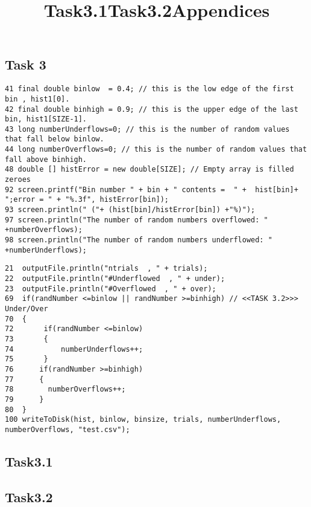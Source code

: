\documentclass{article}
\begin{document}
\begin{multicols}{2}
	\section{Task 3}
		\begin{table*}[h]
			\title{Task3.1}
			\begin{lstlisting}
41 final double binlow  = 0.4; // this is the low edge of the first bin , hist1[0].       
42 final double binhigh = 0.9; // this is the upper edge of the last bin, hist1[SIZE-1].  
43 long numberUnderflows=0; // this is the number of random values that fall below binlow.
44 long numberOverflows=0; // this is the number of random values that fall above binhigh. 
48 double [] histError = new double[SIZE]; // Empty array is filled zeroes  
92 screen.printf("Bin number " + bin + " contents =  " +  hist[bin]+ ";error = " + "%.3f", histError[bin]);
93 screen.println(" ("+ (hist[bin]/histError[bin]) +"%)");                
97 screen.println("The number of random numbers overflowed: " +numberOverflows);
98 screen.println("The number of random numbers underflowed: " +numberUnderflows); 
\end{lstlisting}
\title{Task3.2}
\begin{lstlisting}
21  outputFile.println("ntrials  , " + trials); 
22  outputFile.println("#Underflowed  , " + under); 
23  outputFile.println("#Overflowed  , " + over); 
69  if(randNumber <=binlow || randNumber >=binhigh) // <<TASK 3.2>>> Under/Over
70  {
72 		 if(randNumber <=binlow)
73 		 {
74  		 numberUnderflows++;
75  	 }
76  	if(randNumber >=binhigh)
77  	{
78 		  numberOverflows++;
79  	}
80  }
100 writeToDisk(hist, binlow, binsize, trials, numberUnderflows, numberOverflows, "test.csv"); 
	\end{lstlisting}
\end{table*}
		\subsection{Task3.1}

		\subsection{Task3.2}
			
			



\end{multicols}
\newpage


\title{Appendices}
\begin{center}

\begin{lstlisting}

\end{lstlisting}

\end{center}
\end{document}

